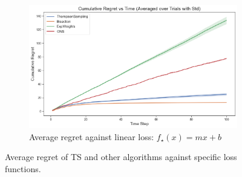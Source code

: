 \documentclass[letter, 12pt]{report}
\newcommand{\1}{\mathbf{1}}
\newcommand{\ts}{\textsc{TS}\xspace}
\theoremstyle{plain}
\theoremstyle{definition}
\theoremstyle{remark}
\begin{document}
\begin{figure}[h!]
    \vspace{0.5em}
    \begin{subfigure}{10cm}
        \centering
        \includegraphics[width=\textwidth]{figures/linear_reg.png}
        \caption{Average regret against linear loss: $f_\star(x) = mx + b$}
        \label{fig:linear-loss-regret}
    \end{subfigure}
    \caption{Average regret of \ts and other algorithms against specific loss functions.}
    \label{fig:specific-losses-reg}
\end{figure}
\end{document}
